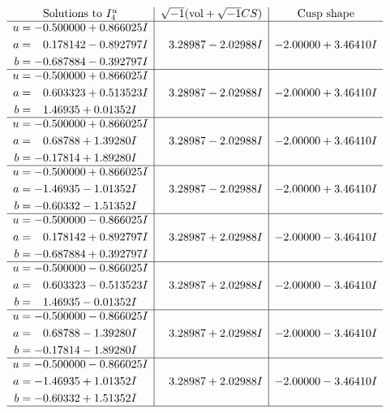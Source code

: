 \documentclass[1p]{elsarticle_modified}
\theoremstyle{definition}
\newcommand{\I}{\sqrt{-1}}
\begin{document}
$$\begin{array}{c|c|c}  
\text{Solutions to }I^u_{4}& \I (\text{vol} + \sqrt{-1}CS) & \text{Cusp shape}\\
 \hline 
\begin{aligned}
u &= -0.500000 + 0.866025 I \\
a &= \phantom{-}0.178142 - 0.892797 I \\
b &= -0.687884 - 0.392797 I\end{aligned}
 & \phantom{-}3.28987 - 2.02988 I & -2.00000 + 3.46410 I \\ \hline\begin{aligned}
u &= -0.500000 + 0.866025 I \\
a &= \phantom{-}0.603323 + 0.513523 I \\
b &= \phantom{-}1.46935 + 0.01352 I\end{aligned}
 & \phantom{-}3.28987 - 2.02988 I & -2.00000 + 3.46410 I \\ \hline\begin{aligned}
u &= -0.500000 + 0.866025 I \\
a &= \phantom{-}0.68788 + 1.39280 I \\
b &= -0.17814 + 1.89280 I\end{aligned}
 & \phantom{-}3.28987 - 2.02988 I & -2.00000 + 3.46410 I \\ \hline\begin{aligned}
u &= -0.500000 + 0.866025 I \\
a &= -1.46935 - 1.01352 I \\
b &= -0.60332 - 1.51352 I\end{aligned}
 & \phantom{-}3.28987 - 2.02988 I & -2.00000 + 3.46410 I \\ \hline\begin{aligned}
u &= -0.500000 - 0.866025 I \\
a &= \phantom{-}0.178142 + 0.892797 I \\
b &= -0.687884 + 0.392797 I\end{aligned}
 & \phantom{-}3.28987 + 2.02988 I & -2.00000 - 3.46410 I \\ \hline\begin{aligned}
u &= -0.500000 - 0.866025 I \\
a &= \phantom{-}0.603323 - 0.513523 I \\
b &= \phantom{-}1.46935 - 0.01352 I\end{aligned}
 & \phantom{-}3.28987 + 2.02988 I & -2.00000 - 3.46410 I \\ \hline\begin{aligned}
u &= -0.500000 - 0.866025 I \\
a &= \phantom{-}0.68788 - 1.39280 I \\
b &= -0.17814 - 1.89280 I\end{aligned}
 & \phantom{-}3.28987 + 2.02988 I & -2.00000 - 3.46410 I \\ \hline\begin{aligned}
u &= -0.500000 - 0.866025 I \\
a &= -1.46935 + 1.01352 I \\
b &= -0.60332 + 1.51352 I\end{aligned}
 & \phantom{-}3.28987 + 2.02988 I & -2.00000 - 3.46410 I\\
 \hline 
 \end{array}$$\newpage
\end{document}
